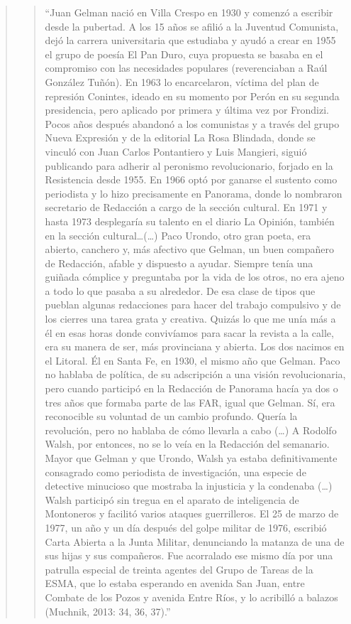 \begin{quote}
\begin{quote}
	\enquote{Juan Gelman nació en Villa Crespo en 1930 y comenzó a escribir desde la pubertad. A los 15 años se afilió a la Juventud Comunista, dejó la carrera universitaria que estudiaba y ayudó a crear en 1955 el grupo de poesía El Pan Duro, cuya propuesta se basaba en el compromiso con las necesidades populares (reverenciaban a Raúl González Tuñón). En 1963 lo encarcelaron, víctima del plan de represión Conintes, ideado en su momento por Perón en su segunda presidencia, pero aplicado por primera y última vez por Frondizi. Pocos años después abandonó a los comunistas y a través del grupo Nueva Expresión y de la editorial La Rosa Blindada, donde se vinculó con Juan Carlos Pontantiero y Luis Mangieri, siguió publicando para adherir al peronismo revolucionario, forjado en la Resistencia desde 1955. En 1966 optó por ganarse el sustento como periodista y lo hizo precisamente en Panorama, donde lo nombraron secretario de Redacción a cargo de la sección cultural. En 1971 y hasta 1973 desplegaría su talento en el diario La Opinión, también en la sección cultural\dots (\dots) Paco Urondo, otro gran poeta, era abierto, canchero y, más afectivo que Gelman, un buen compañero de Redacción, afable y dispuesto a ayudar. Siempre tenía una guiñada cómplice y preguntaba por la vida de los otros, no era ajeno a todo lo que pasaba a su alrededor. De esa clase de tipos que pueblan algunas redacciones para hacer del trabajo compulsivo y de los cierres una tarea grata y creativa. Quizás lo que me unía más a él en esas horas donde convivíamos para sacar la revista a la calle, era su manera de ser, más provinciana y abierta. Los dos nacimos en el Litoral. Él en Santa Fe, en 1930, el mismo año que Gelman. Paco no hablaba de política, de su adscripción a una visión revolucionaria, pero cuando participó en la Redacción de Panorama hacía ya dos o tres años que formaba parte de las FAR, igual que Gelman. Sí, era reconocible su voluntad de un cambio profundo. Quería la revolución, pero no hablaba de cómo llevarla a cabo (\dots) A Rodolfo Walsh, por entonces, no se lo veía en la Redacción del semanario. Mayor que Gelman y que Urondo, Walsh ya estaba definitivamente consagrado como periodista de investigación, una especie de detective minucioso que mostraba la injusticia y la condenaba (\dots) Walsh participó sin tregua en el aparato de inteligencia de Montoneros y facilitó varios ataques guerrilleros. El 25 de marzo de 1977, un año y un día después del golpe militar de 1976, escribió Carta Abierta a la Junta Militar, denunciando la matanza de una de sus hijas y sus compañeros. Fue acorralado ese mismo día por una patrulla especial de treinta agentes del Grupo de Tareas de la ESMA, que lo estaba esperando en avenida San Juan, entre Combate de los Pozos y avenida Entre Ríos, y lo acribilló a balazos (Muchnik, 2013: 34, 36, 37).}
\end{quote}



\end{quote}
